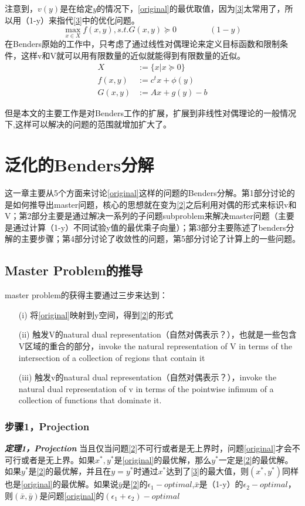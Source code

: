 \documentclass[UTF8,a4]{article}
\begin{document}
注意到，$v(y)$是在给定$y$的情况下，\eqref{original}的最优取值，因为\eqref{3}太常用了，所以用（1-y）来指代\eqref{3}中的优化问题。
$$\max_{x\in X}f(x,y),s.t. G(x,y)\succeq 0 \quad\quad\quad\quad(1-y)$$
在Benders原始的工作中，只考虑了通过线性对偶理论来定义目标函数和限制条件，这样v和V就可以用有限数量的近似就能得到有限数量的近似。
\begin{subequations}
\begin{align}
X&:=\{x|x\succeq0 \}\\
f(x,y)&:=c^tx+\phi(y)\\
G(x,y)&:=Ax+g(y)-b
\end{align}
\end{subequations}

但是本文的主要工作是对Benders工作的扩展，扩展到非线性对偶理论的一般情况下,这样可以解决的问题的范围就增加扩大了。

\section{泛化的Benders分解}
这一章主要从5个方面来讨论\eqref{original}这样的问题的Benders分解。第1部分讨论的是如何推导出master问题，核心的思想就在变为\eqref{2}之后利用对偶的形式来标识v和V；第2部分主要是通过解决一系列的子问题subproblem来解决master问题（主要是通过计算（1-y）不同试验y值的最优乘子向量）；第3部分主要陈述了benders分解的主要步骤；第4部分讨论了收敛性的问题，第5部分讨论了计算上的一些问题。
\subsection{Master Problem的推导}
master problem的获得主要通过三步来达到：
\begin{itemize}
\item[(i)]将\eqref{original}映射到y空间，得到\eqref{2}的形式
\item[(ii)]触发V的natural dual representation（自然对偶表示？），也就是一些包含V区域的重合的部分，invoke the natural representation of V in terms of the intersection of a collection of regions  that contain it
\item[(iii)]触发v的natural dual representation（自然对偶表示？），invoke the natural dual representation of v in terms of the pointwise infimum of a collection of functions that dominate it.
\end{itemize}

\subsubsection{步骤1，Projection}
\textbf{\emph{定理1，Projection}}
当且仅当问题\eqref{2}不可行或者是无上界时，问题\eqref{original}才会不可行或者是无上界。如果$x^*,y^*$是\eqref{original}的最优解，那么$y^*$一定是\eqref{2}的最优解。如果$y^*$是\eqref{2}的最优解，并且在$y=y^*$时通过$x^*$达到了\eqref{3}的最大值，则$(x^*,y^*)$同样也是\eqref{original}的最优解。如果说$\bar{y}$是\eqref{2}的$\epsilon_1-optimal$,$\bar{x}$是（1-y）的$\epsilon_2-optimal$，则$(\bar{x},\bar{y})$是问题\eqref{original}的$(\epsilon_1+\epsilon_2)-optimal$
\end{document}

